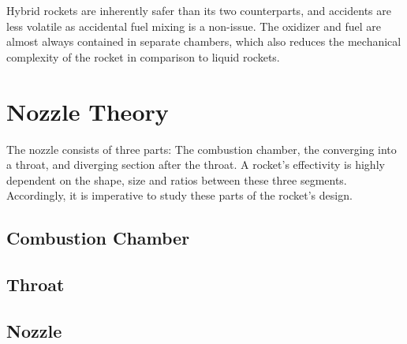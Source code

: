   Hybrid rockets are inherently safer than its two counterparts, and accidents are less volatile as accidental fuel mixing is a non-issue. The oxidizer and fuel are almost always contained in separate chambers, which also reduces the mechanical complexity of the rocket in comparison to liquid rockets.

\section{Nozzle Theory}

  The nozzle consists of three parts: The combustion chamber, the converging into a throat, and diverging section after the throat. A rocket's effectivity is highly dependent on the shape, size and ratios between these three segments. Accordingly, it is imperative to study these parts of the rocket's design.

\subsection{Combustion Chamber}
\subsection{Throat}
\subsection{Nozzle}
